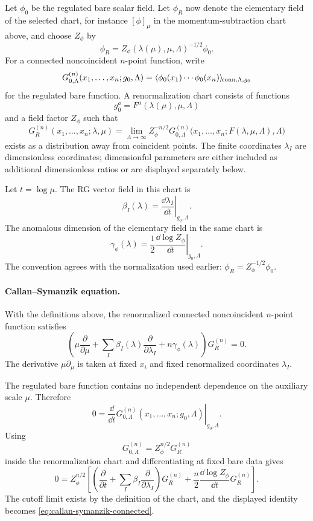 Let \(\phi_0\) be the regulated bare scalar field.  Let \(\phi_R\) now denote
the elementary field of the selected chart, for instance \([\phi]_\mu\) in the
momentum-subtraction chart above, and choose \(Z_\phi\) by
\[
  \phi_R=Z_\phi(\lambda(\mu),\mu,\Lambda)^{-1/2}\phi_0 .
\]
For a connected noncoincident \(n\)-point function, write
\[
  G_{0,\Lambda}^{(n)}(x_1,\ldots,x_n;g_0,\Lambda)
  =
  \langle
    \phi_0(x_1)\cdots\phi_0(x_n)
  \rangle_{\!{\rm conn},\Lambda,g_0}
\]
for the regulated bare function.  A renormalization chart consists of
functions
\[
  g_0^a=F^a(\lambda(\mu),\mu,\Lambda)
\]
and a field factor \(Z_\phi\) such that
\[
  G_R^{(n)}(x_1,\ldots,x_n;\lambda,\mu)
  =
  \lim_{\Lambda\to\infty}
  Z_\phi^{-n/2}
  G_{0,\Lambda}^{(n)}
  \bigl(x_1,\ldots,x_n;F(\lambda,\mu,\Lambda),\Lambda\bigr)
\]
exists as a distribution away from coincident points.  The finite coordinates
\(\lambda_I\) are dimensionless coordinates; dimensionful parameters are
either included as additional dimensionless ratios or are displayed separately
below.

Let \(t=\log\mu\).  The RG vector field in this chart is
\[
  \beta_I(\lambda)
  =
  \left.
  \frac{\dd\lambda_I}{\dd t}
  \right|_{g_0,\Lambda}.
\]
The anomalous dimension of the elementary field in the same chart is
\[
  \gamma_\phi(\lambda)
  =
  \frac12
  \left.
  \frac{\dd\log Z_\phi}{\dd t}
  \right|_{g_0,\Lambda}.
\]
The convention agrees with the normalization used earlier:
\(\phi_R=Z_\phi^{-1/2}\phi_0\).

\paragraph{Callan--Symanzik equation.}
With the definitions above, the renormalized connected noncoincident
\(n\)-point function satisfies
\begin{equation}
  \left(
    \mu\frac{\partial}{\partial\mu}
    +
    \sum_I\beta_I(\lambda)\frac{\partial}{\partial\lambda_I}
    +
    n\gamma_\phi(\lambda)
  \right)
  G_R^{(n)}
  =
  0 .
  \label{eq:callan-symanzik-connected}
\end{equation}
The derivative \(\mu\partial_\mu\) is taken at fixed \(x_i\) and fixed
renormalized coordinates \(\lambda_I\).

The regulated bare function contains no independent dependence on the
auxiliary scale \(\mu\).  Therefore
\[
  0
  =
  \left.
  \frac{\dd}{\dd t}
  G_{0,\Lambda}^{(n)}(x_1,\ldots,x_n;g_0,\Lambda)
  \right|_{g_0,\Lambda}.
\]
Using
\[
  G_{0,\Lambda}^{(n)}
  =
  Z_\phi^{n/2}G_R^{(n)}
\]
inside the renormalization chart and differentiating at fixed bare data gives
\[
  0
  =
  Z_\phi^{n/2}
  \left[
    \left(
      \frac{\partial}{\partial t}
      +
      \sum_I\beta_I\frac{\partial}{\partial\lambda_I}
    \right)G_R^{(n)}
    +
    \frac n2
    \frac{\dd\log Z_\phi}{\dd t}
    G_R^{(n)}
  \right].
\]
The cutoff limit exists by the definition of the chart, and the displayed
identity becomes \eqref{eq:callan-symanzik-connected}.


